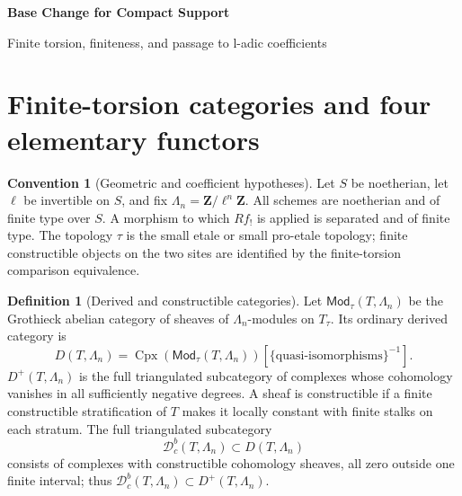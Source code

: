 \documentclass[10pt]{article}
\theoremstyle{definition}
\newtheorem{definition}[theorem]{Definition}
\newtheorem{convention}[theorem]{Convention}
\newcommand{\Dbc}{\mathcal D^b_c}
\newcommand{\Mod}{\mathsf{Mod}}
\begin{document}
\begin{center}
{\large\bfseries Base Change for Compact Support\par}
\medskip
{\normalsize Finite torsion, finiteness, and passage to l-adic coefficients\par}
\end{center}

\begin{abstract}
For a separated finite-type morphism, compact-support base change is formed
from open-extension exchange and proper base change after choosing a
compactification.  Refinement compatibility makes the result independent
of that choice.  The finite-torsion construction is followed by
constructibility and cohomological-dimension theorems, then by integral
adic realization, rationalization, and extension to algebraically closed
l-adic coefficients.  All derived categories are ordinary
Verdier-localized triangulated categories.
\end{abstract}

\tableofcontents

\section{Finite-torsion categories and four elementary functors}

\begin{convention}[Geometric and coefficient hypotheses]
Let \(S\) be noetherian, let \(\ell\) be invertible on \(S\), and fix
\(\Lambda_n=\mathbf Z/\ell^n\mathbf Z\).  All schemes are noetherian and of
finite type over \(S\).  A morphism to which \(Rf_!\) is applied is separated
and of finite type.  The topology \(\tau\) is the small etale or small
pro-etale topology; finite constructible objects on the two sites are
identified by the finite-torsion comparison equivalence.
\end{convention}

\begin{definition}[Derived and constructible categories]
Let \(\Mod_\tau(T,\Lambda_n)\) be the Grothieck abelian category of sheaves
of \(\Lambda_n\)-modules on \(T_\tau\).  Its ordinary derived category is
\[
 D(T,\Lambda_n)=
 \operatorname{Cpx}(\Mod_\tau(T,\Lambda_n))
 [\{\text{quasi-isomorphisms}\}^{-1}].
\]
\(D^+(T,\Lambda_n)\) is the full triangulated subcategory of complexes
whose cohomology vanishes in all sufficiently negative degrees.
A sheaf is constructible if a finite constructible stratification of \(T\)
makes it locally constant with finite stalks on each stratum.  The full
triangulated subcategory
\[
 \Dbc(T,\Lambda_n)\subset D(T,\Lambda_n)
\]
consists of complexes with constructible cohomology sheaves, all zero
outside one finite interval; thus \(\Dbc(T,\Lambda_n)\subset
D^+(T,\Lambda_n)\).
\end{definition}
\end{document}
